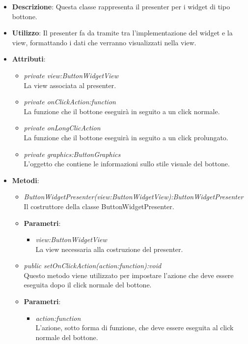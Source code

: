 \begin{itemize}
\item \textbf{Descrizione}: Questa classe rappresenta il presenter per i widget di tipo bottone.
\item \textbf{Utilizzo}: Il presenter fa da tramite tra l'implementazione del widget e la view, formattando i dati che verranno visualizzati nella view.
\item \textbf{Attributi}:
	\begin{itemize}
	\item \textit{private view:ButtonWidgetView}\\
	La view associata al presenter.
	\item \textit{private onClickAction:function}\\
	La funzione che il bottone eseguirà in seguito a un click normale.
	\item \textit{private onLongClicAction}\\
	La funzione che il bottone eseguirà in seguito a un click prolungato.
	\item \textit{private graphics:ButtonGraphics}\\
	L'oggetto che contiene le informazioni sullo stile visuale del bottone.
	\end{itemize}
\item \textbf{Metodi}:
	\begin{itemize}
	\item \textit{ButtonWidgetPresenter(view:ButtonWidgetView):ButtonWidgetPresenter}\\
	Il costruttore della classe ButtonWidgetPresenter.
		\item{\textbf{Parametri}: \begin{itemize}
		\item \textit{view:ButtonWidgetView}\\
		La view necessaria alla costruzione del presenter.
		\end{itemize}}
	\item \textit{public setOnClickAction(action:function):void}\\
	Questo metodo viene utilizzato per impostare l'azione che deve essere eseguita dopo il click normale del bottone.
		\item{\textbf{Parametri}: \begin{itemize}
		\item \textit{action:function}\\
		L'azione, sotto forma di funzione, che deve essere eseguita al click normale del bottone.

\end{itemize}}
\end{itemize}
\end{itemize}
